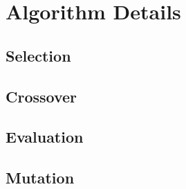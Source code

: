 \chapter{Algorithm Details}
\label{cha:algorithm_details}



\section{Selection} %
\label{sec:selection}



\section{Crossover} %
\label{sec:crossover}



\section{Evaluation} %
\label{sec:evaluation}



\section{Mutation} %
\label{sec:mutation}